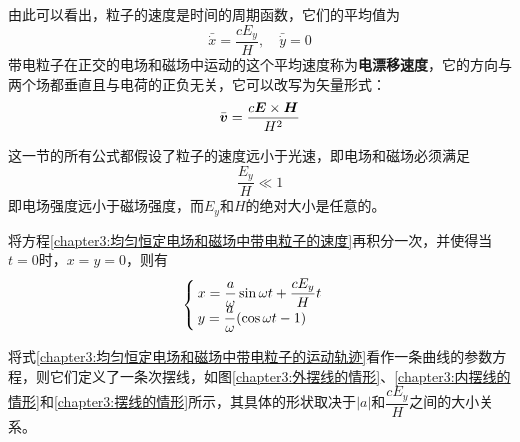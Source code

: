 由此可以看出，粒子的速度是时间的周期函数，它们的平均值为
\begin{equation*}
	\bar{\dot{x}} = \frac{cE_y}{H},\quad \bar{\dot{y}} = 0
\end{equation*}
带电粒子在正交的电场和磁场中运动的这个平均速度称为{\bf 电漂移速度}，它的方向与两个场都垂直且与电荷的正负无关，它可以改写为矢量形式：
\begin{equation}
	\bar{\boldsymbol{v}} = \frac{c\boldsymbol{E}\times \boldsymbol{H}}{H^2}
	\label{chapter3:电漂移速度}
\end{equation}

这一节的所有公式都假设了粒子的速度远小于光速，即电场和磁场必须满足
\begin{equation}
	\frac{E_y}{H} \ll 1
\end{equation}
即电场强度远小于磁场强度，而$E_y$和$H$的绝对大小是任意的。

将方程\eqref{chapter3:均匀恒定电场和磁场中带电粒子的速度}再积分一次，并使得当$t=0$时，$x=y=0$，则有
\begin{equation}
\begin{cases}
	\displaystyle x = \frac{a}{\omega}\sin\omega t+\frac{cE_y}{H}t \\
	\displaystyle y = \frac{a}{\omega}(\cos \omega t - 1)
\end{cases}
\label{chapter3:均匀恒定电场和磁场中带电粒子的运动轨迹}
\end{equation}

将式\eqref{chapter3:均匀恒定电场和磁场中带电粒子的运动轨迹}看作一条曲线的参数方程，则它们定义了一条次摆线，如图\ref{chapter3:外摆线的情形}、\ref{chapter3:内摆线的情形}和\ref{chapter3:摆线的情形}所示，其具体的形状取决于$|a|$和$\dfrac{cE_y}{H}$之间的大小关系。


